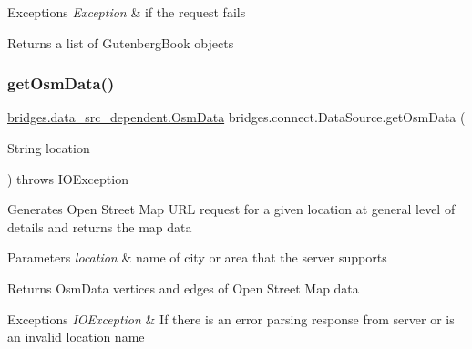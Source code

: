 \begin{DoxyExceptions}{Exceptions}
{\em Exception} & if the request fails\\
\hline
\end{DoxyExceptions}
\begin{DoxyReturn}{Returns}
a list of Gutenberg\+Book objects 
\end{DoxyReturn}
\mbox{\label{classbridges_1_1connect_1_1_data_source_a61c6282b6d25d30f76a7540bf21c0873}} 
\subsubsection{\texorpdfstring{get\+Osm\+Data()}{getOsmData()}\hspace{0.1cm}{\footnotesize\ttfamily [1/3]}}
{\footnotesize\ttfamily \hyperlink{classbridges_1_1data__src__dependent_1_1_osm_data}{bridges.\+data\+\_\+src\+\_\+dependent.\+Osm\+Data} bridges.\+connect.\+Data\+Source.\+get\+Osm\+Data (\begin{DoxyParamCaption}\item[{String}]{location }\end{DoxyParamCaption}) throws I\+O\+Exception}

Generates Open Street Map U\+RL request for a given location at general level of details and returns the map data 
\begin{DoxyParams}{Parameters}
{\em location} & name of city or area that the server supports \\
\hline
\end{DoxyParams}
\begin{DoxyReturn}{Returns}
Osm\+Data vertices and edges of Open Street Map data 
\end{DoxyReturn}

\begin{DoxyExceptions}{Exceptions}
{\em I\+O\+Exception} & If there is an error parsing response from server or is an invalid location name \\
\hline
\end{DoxyExceptions}
\mbox{\label{classbridges_1_1connect_1_1_data_source_ae82f6a4feff0af28f4aae55986e1560c}} 
